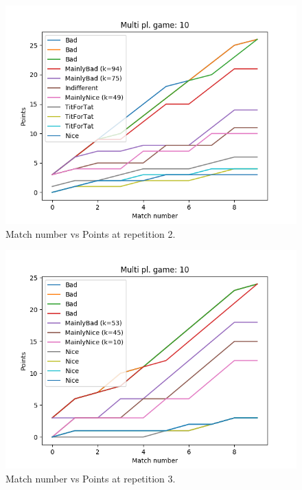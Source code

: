 \documentclass[journal,a4paper,10pt,twoside]{IEEEtran}
\begin{document}
\begin{figure}[ht]
    \centering
    \includegraphics[width=1\columnwidth]{../img_v1/ridpmp-scores-10-r1.png}
    \caption{Match number vs Points at repetition 2.}
    \label{fig:rmpipd2}
\end{figure}

\begin{figure}[ht]
    \centering
    \includegraphics[width=1\columnwidth]{../img_v1/ridpmp-scores-10-r2.png}
    \caption{Match number vs Points at repetition 3.}
    \label{fig:rmpipd3}
\end{figure}
\end{document}
